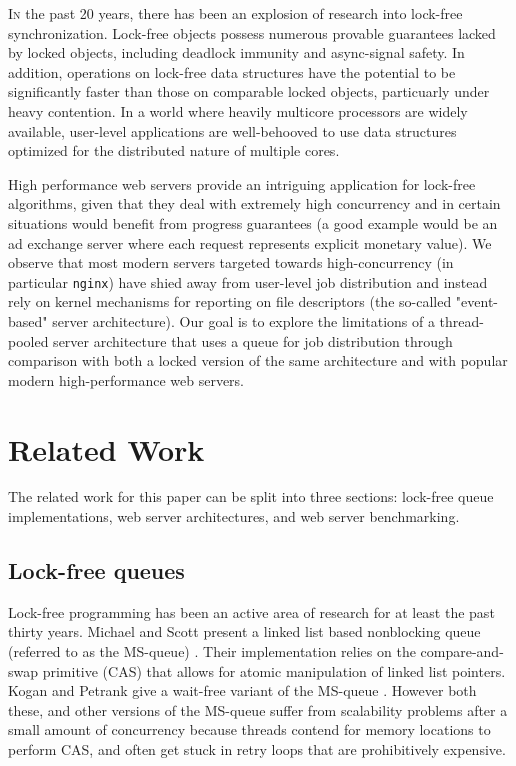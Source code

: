 \documentclass[twoside,10pt]{article}
\begin{document}
\begin{multicols}{2}
  \lettrine[nindent=0em,lines=3]{I}n the past 20 years, there has been
  an explosion of research into lock-free synchronization. Lock-free
  objects possess numerous provable guarantees lacked by locked
  objects, including deadlock immunity and async-signal safety. In
  addition, operations on lock-free data structures have the potential
  to be significantly faster than those on comparable locked objects,
  particuarly under heavy contention. In a world where heavily
  multicore processors are widely available, user-level applications
  are well-behooved to use data structures optimized for the
  distributed nature of multiple cores.
  
High performance web servers provide an intriguing application for
lock-free algorithms, given that they deal with extremely high
concurrency and in certain situations would benefit from progress
guarantees (a good example would be an ad exchange server where each
request represents explicit monetary value). We observe that most
modern servers targeted towards high-concurrency (in particular
\verb+nginx+) have shied away from user-level job distribution and
instead rely on kernel mechanisms for reporting on file descriptors
(the so-called "event-based" server architecture). Our goal is to
explore the limitations of a thread-pooled server architecture that
uses a queue for job distribution through comparison with both a
locked version of the same architecture and with popular modern
high-performance web servers.

\section{Related Work}

The related work for this paper can be split into three sections:
lock-free queue implementations, web server architectures, and web
server benchmarking.

\subsection{Lock-free queues}

Lock-free programming has been an active area of research for at least
the past thirty years. Michael and Scott present a linked list based
nonblocking queue (referred to as the MS-queue) \cite{MS96}. Their
implementation relies on the compare-and-swap primitive (CAS) that
allows for atomic manipulation of linked list pointers. Kogan and
Petrank give a wait-free variant of the MS-queue \cite{KP11}. However
both these, and other versions of the MS-queue suffer from scalability
problems after a small amount of concurrency because threads contend
for memory locations to perform CAS, and often get stuck in retry
loops that are prohibitively expensive.


\end{multicols}
\end{document}
